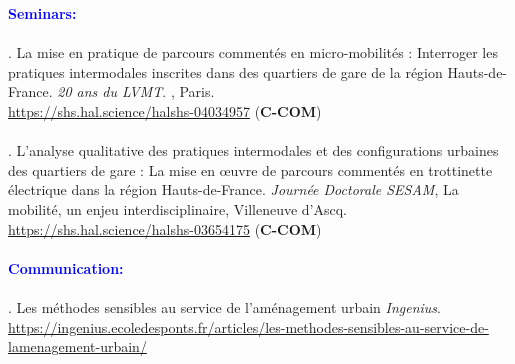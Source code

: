 \begin{refsegment}
     \newpage
     
    \begin{tcolorbox}[colback=white!5!white,
                      colframe=blue!75!blue,
                      title=Valorization
                      \\
                      Chapitre~3]
\Large{\textcolor{blue}{\textbf{Seminars:}}}
    \\\\
\small{\textcolor{blue}{\textcite{moinse_mise_2023}}. La mise en pratique de parcours commentés en micro-mobilités : Interroger les pratiques intermodales inscrites dans des quartiers de gare de la région Hauts-de-France. \textsl{20 ans du LVMT}. , Paris.
\\
\footnotesize{\url{https://shs.hal.science/halshs-04034957}} (\textbf{C-COM})}
    \\\\
\small{\textcolor{blue}{\textcite{moinse_analyse_2022}}. L'analyse qualitative des pratiques intermodales et des configurations urbaines des quartiers de gare : La mise en œuvre de parcours commentés en trottinette électrique dans la région Hauts-de-France. \textsl{Journée Doctorale SESAM}, La mobilité, un enjeu interdisciplinaire, Villeneuve d'Ascq.
\\
\footnotesize{\url{https://shs.hal.science/halshs-03654175}} (\textbf{C-COM})}
    \\\\
\Large{\textcolor{blue}{\textbf{Communication:}}}
    \\\\
\small{\textcolor{blue}{\textcite{lehmann_methodes_2023}}. Les méthodes sensibles au service de l’aménagement urbain \textsl{Ingenius}. 
\\
\footnotesize{\url{https://ingenius.ecoledesponts.fr/articles/les-methodes-sensibles-au-service-de-lamenagement-urbain/}}}
    \end{tcolorbox}

    \newpage
    \begingroup
    \renewcommand{\bibfont}{\scriptsize}
\printbibliography[segment=\therefsegment, heading=subbibintoc, title={Bibliography of Chapter~3}, label=chap3:bibliographie]
    \endgroup
    \end{refsegment}